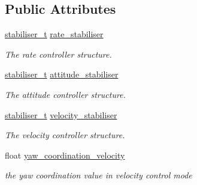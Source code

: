 \subsection*{Public Attributes}
\begin{DoxyCompactItemize}
\item 
\hypertarget{structstabiliser__stack__copter__t_a9bd4967315dd5ff4a412121082ae2a60}{\hyperlink{structstabiliser__t}{stabiliser\+\_\+t} \hyperlink{structstabiliser__stack__copter__t_a9bd4967315dd5ff4a412121082ae2a60}{rate\+\_\+stabiliser}}\label{structstabiliser__stack__copter__t_a9bd4967315dd5ff4a412121082ae2a60}

\begin{DoxyCompactList}\small\item\em The rate controller structure. \end{DoxyCompactList}\item 
\hypertarget{structstabiliser__stack__copter__t_afb47bdffc2810372e0c22d783327a1a8}{\hyperlink{structstabiliser__t}{stabiliser\+\_\+t} \hyperlink{structstabiliser__stack__copter__t_afb47bdffc2810372e0c22d783327a1a8}{attitude\+\_\+stabiliser}}\label{structstabiliser__stack__copter__t_afb47bdffc2810372e0c22d783327a1a8}

\begin{DoxyCompactList}\small\item\em The attitude controller structure. \end{DoxyCompactList}\item 
\hypertarget{structstabiliser__stack__copter__t_a1efdb71c834ee94aa4a4bdfc999cb3b4}{\hyperlink{structstabiliser__t}{stabiliser\+\_\+t} \hyperlink{structstabiliser__stack__copter__t_a1efdb71c834ee94aa4a4bdfc999cb3b4}{velocity\+\_\+stabiliser}}\label{structstabiliser__stack__copter__t_a1efdb71c834ee94aa4a4bdfc999cb3b4}

\begin{DoxyCompactList}\small\item\em The velocity controller structure. \end{DoxyCompactList}\item 
\hypertarget{structstabiliser__stack__copter__t_ae0259c1b778f8d03088e3c1993308072}{float \hyperlink{structstabiliser__stack__copter__t_ae0259c1b778f8d03088e3c1993308072}{yaw\+\_\+coordination\+\_\+velocity}}\label{structstabiliser__stack__copter__t_ae0259c1b778f8d03088e3c1993308072}

\begin{DoxyCompactList}\small\item\em the yaw coordination value in velocity control mode \end{DoxyCompactList}\end{DoxyCompactItemize}


